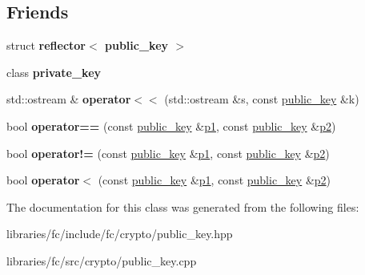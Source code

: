 \subsection*{Friends}
\begin{DoxyCompactItemize}
\item 
\mbox{\label{classfc_1_1crypto_1_1public__key_a73f52d17b21a2cceeaa795c6e3d66e30}} 
struct {\bfseries reflector$<$ public\+\_\+key $>$}
\item 
\mbox{\label{classfc_1_1crypto_1_1public__key_ae1389c6c19ec8630ce31970de2294915}} 
class {\bfseries private\+\_\+key}
\item 
\mbox{\label{classfc_1_1crypto_1_1public__key_afe8fd93cba1d82855efdfe2e1cc54715}} 
std\+::ostream \& {\bfseries operator$<$$<$} (std\+::ostream \&s, const \mbox{\hyperlink{classfc_1_1crypto_1_1public__key}{public\+\_\+key}} \&k)
\item 
\mbox{\label{classfc_1_1crypto_1_1public__key_a9e3e72a0ad06ab3eebc34739777fbcde}} 
bool {\bfseries operator==} (const \mbox{\hyperlink{classfc_1_1crypto_1_1public__key}{public\+\_\+key}} \&\mbox{\hyperlink{classp1}{p1}}, const \mbox{\hyperlink{classfc_1_1crypto_1_1public__key}{public\+\_\+key}} \&\mbox{\hyperlink{classp2}{p2}})
\item 
\mbox{\label{classfc_1_1crypto_1_1public__key_a4f510cf56ab9b2e6806b266f5f08d606}} 
bool {\bfseries operator!=} (const \mbox{\hyperlink{classfc_1_1crypto_1_1public__key}{public\+\_\+key}} \&\mbox{\hyperlink{classp1}{p1}}, const \mbox{\hyperlink{classfc_1_1crypto_1_1public__key}{public\+\_\+key}} \&\mbox{\hyperlink{classp2}{p2}})
\item 
\mbox{\label{classfc_1_1crypto_1_1public__key_a848bb1108ea177af5820d7ee3c1a71e3}} 
bool {\bfseries operator$<$} (const \mbox{\hyperlink{classfc_1_1crypto_1_1public__key}{public\+\_\+key}} \&\mbox{\hyperlink{classp1}{p1}}, const \mbox{\hyperlink{classfc_1_1crypto_1_1public__key}{public\+\_\+key}} \&\mbox{\hyperlink{classp2}{p2}})
\end{DoxyCompactItemize}


The documentation for this class was generated from the following files\+:\begin{DoxyCompactItemize}
\item 
libraries/fc/include/fc/crypto/public\+\_\+key.\+hpp\item 
libraries/fc/src/crypto/public\+\_\+key.\+cpp\end{DoxyCompactItemize}
